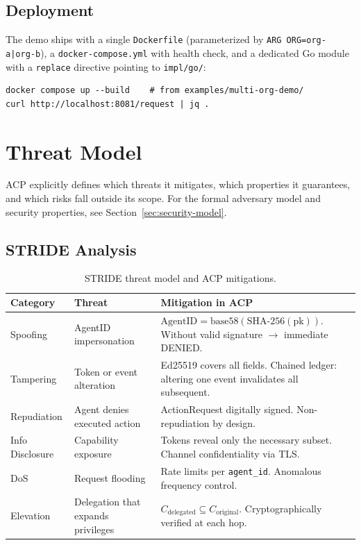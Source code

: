 \documentclass[11pt]{article}
\theoremstyle{definition}
\begin{document}
\subsection{Deployment}

The demo ships with a single \texttt{Dockerfile} (parameterized by \texttt{ARG ORG=org-a|org-b}), a \texttt{docker-compose.yml} with health check, and a dedicated Go module with a \texttt{replace} directive pointing to \texttt{impl/go/}:

\begin{lstlisting}
docker compose up --build    # from examples/multi-org-demo/
curl http://localhost:8081/request | jq .
\end{lstlisting}

\section{Threat Model}
\label{sec:threat-model}

ACP explicitly defines which threats it mitigates, which properties it guarantees,
and which risks fall outside its scope.
For the formal adversary model and security properties, see Section~\ref{sec:security-model}.

\subsection{STRIDE Analysis}

\begin{table}[h!]
\centering
\small
\begin{tabular}{@{}llp{6.5cm}@{}}
\toprule
\textbf{Category} & \textbf{Threat} & \textbf{Mitigation in ACP} \\
\midrule
Spoofing & AgentID impersonation & $\text{AgentID} = \text{base58}(\text{SHA-256}(\text{pk}))$. Without valid signature $\rightarrow$ immediate DENIED. \\
Tampering & Token or event alteration & Ed25519 covers all fields. Chained ledger: altering one event invalidates all subsequent. \\
Repudiation & Agent denies executed action & ActionRequest digitally signed. Non-repudiation by design. \\
Info Disclosure & Capability exposure & Tokens reveal only the necessary subset. Channel confidentiality via TLS. \\
DoS & Request flooding & Rate limits per \texttt{agent\_id}. Anomalous frequency control. \\
Elevation & Delegation that expands privileges & $C_{\text{delegated}} \subseteq C_{\text{original}}$. Cryptographically verified at each hop. \\
\bottomrule
\end{tabular}
\caption{STRIDE threat model and ACP mitigations.}
\end{table}
\end{document}

